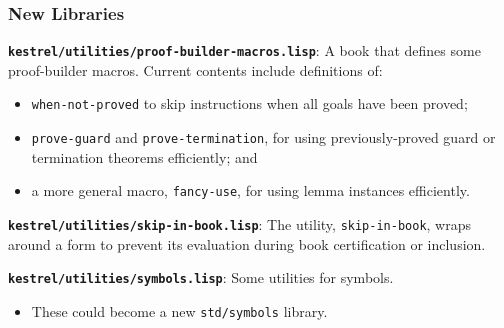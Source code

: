 \documentclass{beamer}
\newcommand{\code}[1]{\texttt{#1}}
\newcommand{\bookpath}[1]{\textbf{\code{#1}}}
\newcommand{\newlibtitle}{\frametitle{New Libraries}}
\newcommand{\separation}{\vspace*{1ex}}
\begin{document}

\begin{frame}

\newlibtitle

\bookpath{kestrel/utilities/proof-builder-macros.lisp}:
A book that defines some proof-builder macros.  Current contents
include definitions of:
\begin{itemize}
\item
\code{when-not-proved} to skip instructions when all goals have
been proved;
\item
\code{prove-guard} and \code{prove-termination}, for using
previously-proved guard or termination theorems efficiently; and
\item
a more general macro, \code{fancy-use}, for using lemma
instances efficiently.
\end{itemize}

\separation

\bookpath{kestrel/utilities/skip-in-book.lisp}:
The utility, \code{skip-in-book}, wraps around a form to prevent its
evaluation during book certification or inclusion.

\separation

\bookpath{kestrel/utilities/symbols.lisp}:
Some utilities for symbols.
\begin{itemize}
\item
These could become a new \code{std/symbols} library.
\end{itemize}

\end{frame}

\end{document}
